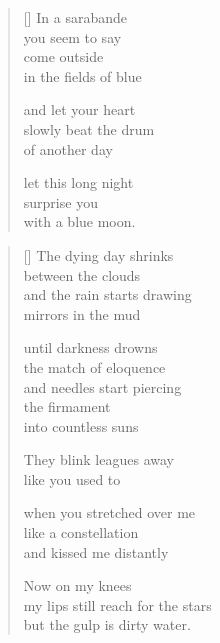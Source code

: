 \documentclass[14pt]{extbook}
\newcommand*{\centeredornament}{\centerline{\pgfornament[width=6cm]{88}}}
\begin{document}
\newpage

\settowidth{\versewidth}{slowly beat the drum}

\begin{verse}[\versewidth]
  In a sarabande \\
  you seem to say \\
  come outside \\
  in the fields of blue

  and let your heart \\
  slowly beat the drum \\
  of another day

  let this long night \\
  surprise you \\
  with a blue moon.
\end{verse}


\newpage

\vspace*{-15mm}
\centeredornament
\vspace*{-7mm}


\settowidth{\versewidth}{my lips still reach for the stars}

\begin{verse}[\versewidth]
  The dying day shrinks \\
  between the clouds \\
  and the rain starts drawing \\
  mirrors in the mud

  until darkness drowns \\
  the match of eloquence \\
  and needles start piercing \\
  the firmament \\
  into countless suns

  They blink leagues away \\
  like you used to

  when you stretched over me \\
  like a constellation \\
  and kissed me distantly

  Now on my knees \\
  my lips still reach for the stars \\
  but the gulp is dirty water.
\end{verse}
\end{document}
